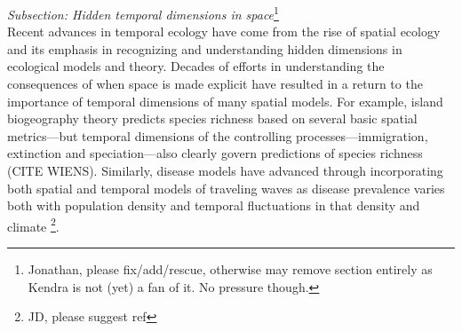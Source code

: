 \documentclass[11pt,a4paper,oneside]{article}
\begin{document}
\noindent \emph{Subsection: Hidden temporal dimensions in space}\footnote{Jonathan, please fix/add/rescue, otherwise may remove section entirely as Kendra is not (yet) a fan of it. No pressure though.}\\
Recent advances in temporal ecology have come from the rise of spatial ecology and its emphasis in recognizing and understanding hidden dimensions in ecological models and theory. Decades of efforts in understanding the consequences of when space is made explicit have resulted in a return to the importance of temporal dimensions of many spatial models. For example, island biogeography theory predicts species richness based on several basic spatial metrics---but temporal dimensions of the controlling processes---immigration, extinction and speciation---also clearly govern predictions of species richness (CITE WIENS). Similarly, disease models have advanced through incorporating both spatial and temporal models of traveling waves \citep{Grenfell:2001ox} as disease prevalence varies both with population density and temporal fluctuations in that density \citep{Grenfell:2001ox} and climate \footnote{JD, please suggest ref}. \\
\end{document}
